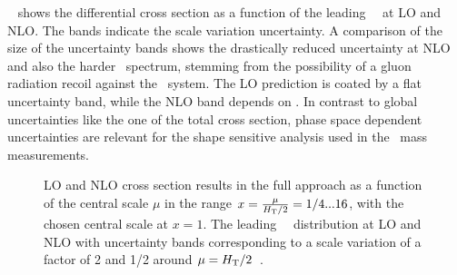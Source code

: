 %
%
\Fig~ shows the differential cross section as a function of the leading \bjet\ \pt\ at \gls{LO} and \gls{NLO}. The bands indicate the scale variation uncertainty. A comparison of the size of the uncertainty bands shows the drastically reduced uncertainty at \gls{NLO} and also the harder \pt\ spectrum, stemming from the possibility of a gluon radiation recoil against the \ttbar\ system. The \gls{LO} prediction is coated by a flat uncertainty band, while the \gls{NLO} band depends on \pt. 
%
In contrast to global uncertainties like the one of the total cross section, phase space dependent uncertainties are relevant for the shape sensitive analysis used in the \tquark\ mass measurements.
%
\begin{figure}[tbp!]
\centering
{}
\caption[Effects of scale variation]{
%
\gls{LO} and \gls{NLO} cross section results  in the full approach as a function of the central scale $\mu$ in the range $x=\frac{\mu}{H_{\mathrm{T}}/2}=1/4...16$, with the chosen central scale at $x=1$.
%
The leading \bjet\ \pt\ distribution  at \gls{LO} and \gls{NLO} with uncertainty bands corresponding to a scale variation of a factor of 2 and 1/2 around $\mu=H_{\mathrm{T}}/2$~\cite{Heinrich2014}.
%
}
\label{fig:scalevar}
\end{figure}
%















